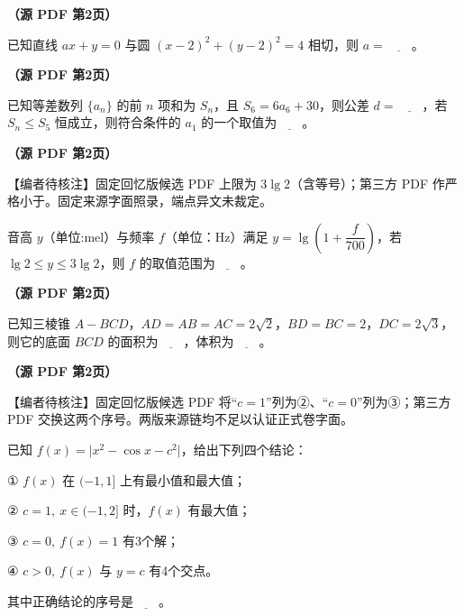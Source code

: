 \begin{question}
\textbf{（源 PDF 第2页）} 

已知直线 \(ax+y=0\) 与圆 \((x-2)^2+(y-2)^2=4\) 相切，则 \(a=\underline{\qquad}\)。

\end{question}
\begin{question}
\textbf{（源 PDF 第2页）} 

已知等差数列 \(\{a_n\}\) 的前 \(n\) 项和为 \(S_n\)，且 \(S_6=6a_6+30\)，则公差 \(d=\underline{\qquad}\)，若 \(S_n\leq S_5\) 恒成立，则符合条件的 \(a_1\) 的一个取值为\(\underline{\qquad}\)。

\end{question}
\begin{question}
\textbf{（源 PDF 第2页）} 

\begin{gktip}
【编者待核注】固定回忆版候选 PDF 上限为 \(3\lg 2\)（含等号）；第三方 PDF 作严格小于。固定来源字面照录，端点异文未裁定。
\end{gktip}

音高 \(y\)（单位:mel）与频率 \(f\)（单位：Hz）满足 \(y=\lg\left(1+\dfrac{f}{700}\right)\)，若 \(\lg 2\leq y\leq 3\lg 2\)，则 \(f\) 的取值范围为\(\underline{\qquad}\)。

\Needspace{0.4\textheight}
\end{question}
\begin{question}
\textbf{（源 PDF 第2页）} 

已知三棱锥 \(A-BCD\)，\(AD=AB=AC=2\sqrt{2}\)，\(BD=BC=2\)，\(DC=2\sqrt{3}\)，则它的底面 \(BCD\) 的面积为\(\underline{\qquad}\)，体积为\(\underline{\qquad}\)。
\nopagebreak[4]
\begin{center}\end{center}
\nopagebreak[4]
\end{question}
\begin{question}
\textbf{（源 PDF 第2页）} 

\begin{gktip}
【编者待核注】固定回忆版候选 PDF 将“\(c=1\)”列为②、“\(c=0\)”列为③；第三方 PDF 交换这两个序号。两版来源链均不足以认证正式卷字面。
\end{gktip}

已知 \(f(x)=\lvert x^2-\cos x-c^2\rvert\)，给出下列四个结论：

① \(f(x)\) 在 \((-1,1]\) 上有最小值和最大值；

② \(c=1,\ x\in(-1,2]\) 时，\(f(x)\) 有最大值；

③ \(c=0,\ f(x)=1\) 有3个解；

④ \(c>0,\ f(x)\) 与 \(y=c\) 有4个交点。

其中正确结论的序号是\(\underline{\qquad}\)。

\end{question}

